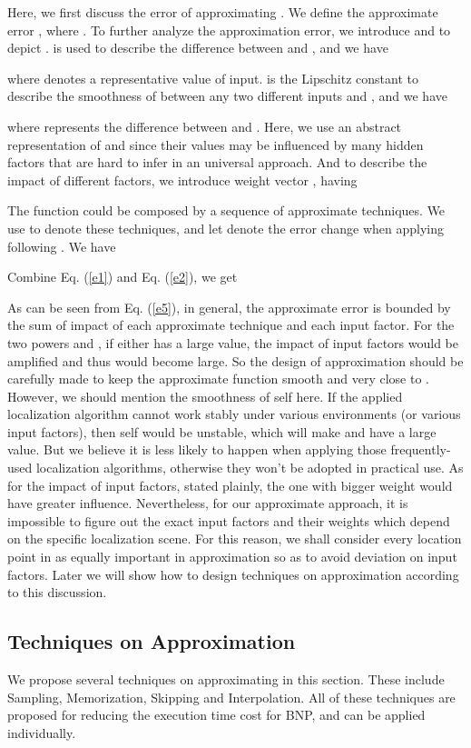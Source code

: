 \documentclass[10pt, conference, letterpaper]{IEEEtran}
\begin{document}
Here, we first discuss the error of approximating . We define the approximate error , where . To further analyze the approximation error, we introduce  and  to depict .  is used to describe the difference between  and , and we have

where  denotes a representative value of input.  is the Lipschitz constant to describe the smoothness of  between any two different inputs  and , and we have

where  represents the difference between  and . Here, we use an abstract representation of  and  since their values may be influenced by many hidden factors that are hard to infer in an universal approach. And to describe the impact of different factors, we introduce weight vector , having


The function  could be composed by a sequence of approximate techniques. We use  to denote these techniques, and let  denote the error change when applying  following . We have

Combine Eq. (\ref{e1}) and Eq. (\ref{e2}), we get
\renewcommand{\arraystretch}{1.5}

\renewcommand{\arraystretch}{0.667}

As can be seen from Eq. (\ref{e5}), in general, the approximate error  is bounded by the sum of impact of each approximate technique and each input factor. For the two powers  and , if either has a large value, the impact of input factors would be amplified and thus  would become large. So the design of approximation should be carefully made to keep the approximate function  smooth and very close to . However, we should mention the smoothness of  self here. If the applied localization algorithm cannot work stably under various environments (or various input factors), then  self would be unstable, which will make  and  have a large value. But we believe it is less likely to happen when applying those frequently-used localization algorithms, otherwise they won't be adopted in practical use. As for the impact of input factors, stated plainly, the one  with bigger weight  would have greater influence. Nevertheless, for our approximate approach, it is impossible to figure out the exact input factors and their weights which depend on the specific localization scene. For this reason, we shall consider every location point in  as equally important in approximation so as to avoid deviation on input factors. Later we will show how to design techniques on approximation according to this discussion.

\subsection{Techniques on Approximation} \label{technique}
We propose several techniques on approximating  in this section. These include Sampling, Memorization, Skipping and Interpolation. All of these techniques are proposed for reducing the execution time cost for BNP, and can be applied individually.
\end{document}
